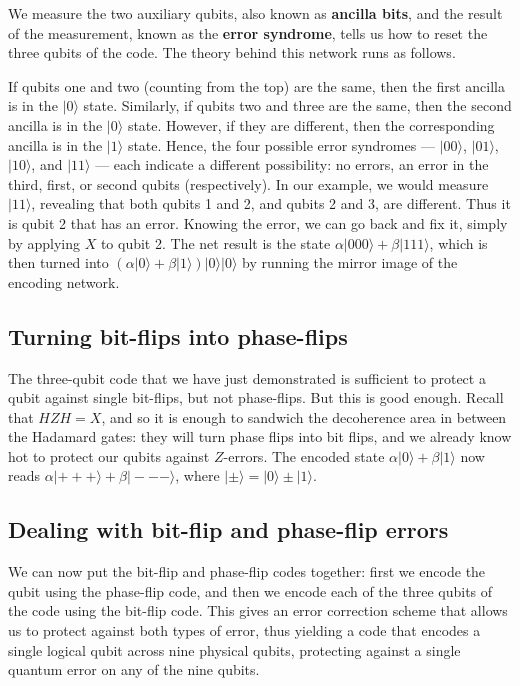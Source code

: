 \documentclass[fleqn]{article}
\begin{document}
We measure the two auxiliary qubits, also known as \textbf{ancilla bits}, and the result of the measurement, known as the \textbf{error syndrome}, tells us how to reset the three qubits of the code.
The theory behind this network runs as follows.

If qubits one and two (counting from the top) are the same, then the first ancilla is in the \(|0\rangle\) state.
Similarly, if qubits two and three are the same, then the second ancilla is in the \(|0\rangle\) state.
However, if they are different, then the corresponding ancilla is in the \(|1\rangle\) state.
Hence, the four possible error syndromes --- \(|00\rangle\), \(|01\rangle\), \(|10\rangle\), and \(|11\rangle\) --- each indicate a different possibility: no errors, an error in the third, first, or second qubits (respectively).
In our example, we would measure \(|11\rangle\), revealing that both qubits 1 and 2, and qubits 2 and 3, are different.
Thus it is qubit 2 that has an error.
Knowing the error, we can go back and fix it, simply by applying \(X\) to qubit 2.
The net result is the state \(\alpha|000\rangle + \beta|111\rangle\), which is then turned into \((\alpha|0\rangle + \beta|1\rangle)|0\rangle|0\rangle\) by running the mirror image of the encoding network.

\hypertarget{turning-bit-flips-into-phase-flips}{%
\subsection{Turning bit-flips into phase-flips}\label{turning-bit-flips-into-phase-flips}}

The three-qubit code that we have just demonstrated is sufficient to protect a qubit against single bit-flips, but not phase-flips.
But this is good enough.
Recall that \(HZH=X\), and so it is enough to sandwich the decoherence area in between the Hadamard gates: they will turn phase flips into bit flips, and we already know hot to protect our qubits against \(Z\)-errors.
The encoded state \(\alpha|0\rangle + \beta|1\rangle\) now reads \(\alpha|+++\rangle+\beta|---\rangle\), where \(|\pm\rangle=|0\rangle\pm|1\rangle\).

\hypertarget{dealing-with-bit-flip-and-phase-flip-errors}{%
\subsection{Dealing with bit-flip and phase-flip errors}\label{dealing-with-bit-flip-and-phase-flip-errors}}

We can now put the bit-flip and phase-flip codes together: first we encode the qubit using the phase-flip code, and then we encode each of the three qubits of the code using the bit-flip code.
This gives an error correction scheme that allows us to protect against both types of error, thus yielding a code that encodes a single logical qubit across nine physical qubits, protecting against a single quantum error on any of the nine qubits.
\end{document}
